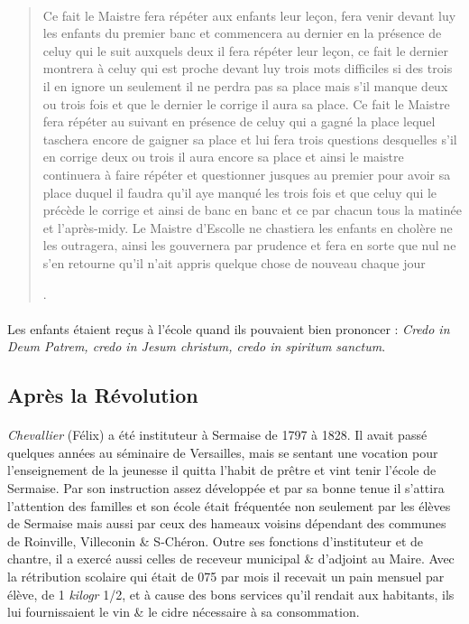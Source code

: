 \documentclass[../eBook.tex]{subfiles}
\begin{document}
\begin{quote}
\begin{sloppypar}
{            \paragraph{}Ce fait le Maistre fera répéter aux enfants leur leçon, fera venir devant luy les enfants du premier banc et commencera au dernier en la présence de celuy qui le suit auxquels deux il fera répéter leur leçon, ce fait le dernier montrera à celuy qui est proche devant luy trois mots difficiles si des trois il en ignore un seulement il ne perdra pas sa place mais s'il manque deux ou trois fois et que le dernier le corrige il aura sa place. Ce fait le Maistre fera répéter au suivant en présence de celuy qui a gagné la place lequel taschera encore de gaigner sa place et lui fera trois questions desquelles s'il en corrige deux ou trois il aura encore sa place et ainsi le maistre continuera à faire répéter et questionner jusques au premier pour avoir sa place duquel il faudra qu'il aye manqué les trois fois et que celuy qui le précède le corrige et ainsi de banc en banc et ce par chacun tous la matinée et l'après-midy. Le Maistre d'Escolle ne chastiera les enfants en cholère ne les outragera, ainsi les gouvernera par prudence et fera en sorte que nul ne s'en retourne qu'il n'ait appris quelque chose de nouveau chaque jour}. \fg{}
          \end{sloppypar}
        \end{quote}
        \paragraph{}Les enfants étaient reçus à l'école quand ils pouvaient bien prononcer : \og \textit{Credo in Deum Patrem, credo in Jesum christum, credo in spiritum sanctum}.\fg{}

    \subsection*{Après la Révolution}
      \paragraph{}\textit{Chevallier} (Félix) a été instituteur à Sermaise de 1797 à 1828. Il avait passé quelques années au séminaire de Versailles, mais se sentant une vocation pour l'enseignement de la jeunesse il quitta l'habit de prêtre et vint tenir l'école de Sermaise. Par son instruction assez développée et par sa bonne tenue il s'attira l'attention des familles et son école était fréquentée non seulement par les élèves de Sermaise mais aussi par ceux des hameaux voisins dépendant des communes de Roinville, Villeconin \& S-Chéron. Outre ses fonctions d'instituteur et de chantre, il a exercé aussi celles de receveur municipal \& d'adjoint au Maire. Avec la rétribution scolaire qui était de 075 par mois il recevait un pain mensuel par élève, de 1 \textit{kilogr} 1/2, et à cause des bons services qu'il rendait aux habitants, ils lui fournissaient le vin \& le cidre nécessaire à sa consommation.
\end{document}
